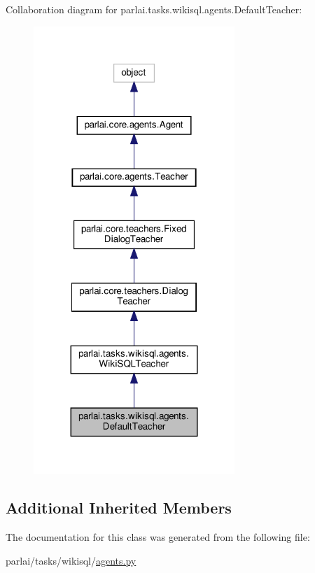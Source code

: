 Collaboration diagram for parlai.\+tasks.\+wikisql.\+agents.\+Default\+Teacher\+:
\nopagebreak
\begin{figure}[H]
\begin{center}
\leavevmode
\includegraphics[width=215pt]{classparlai_1_1tasks_1_1wikisql_1_1agents_1_1DefaultTeacher__coll__graph}
\end{center}
\end{figure}
\subsection*{Additional Inherited Members}


The documentation for this class was generated from the following file\+:\begin{DoxyCompactItemize}
\item 
parlai/tasks/wikisql/\hyperlink{parlai_2tasks_2wikisql_2agents_8py}{agents.\+py}\end{DoxyCompactItemize}
